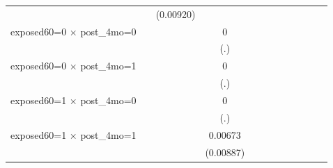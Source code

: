 \begin{table}[htbp]
\begin{tabular}{l*{11}{c}}
                    &                     &   (0.00920)         &                     &                     &                     &                     &                     &                     &                     &                     &                     \\
\addlinespace
exposed60=0 $\times$ post\_4mo=0&                     &                     &           0         &                     &                     &                     &                     &                     &                     &                     &                     \\
                    &                     &                     &         (.)         &                     &                     &                     &                     &                     &                     &                     &                     \\
\addlinespace
exposed60=0 $\times$ post\_4mo=1&                     &                     &           0         &                     &                     &                     &                     &                     &                     &                     &                     \\
                    &                     &                     &         (.)         &                     &                     &                     &                     &                     &                     &                     &                     \\
\addlinespace
exposed60=1 $\times$ post\_4mo=0&                     &                     &           0         &                     &                     &                     &                     &                     &                     &                     &                     \\
                    &                     &                     &         (.)         &                     &                     &                     &                     &                     &                     &                     &                     \\
\addlinespace
exposed60=1 $\times$ post\_4mo=1&                     &                     &     0.00673         &                     &                     &                     &                     &                     &                     &                     &                     \\
                    &                     &                     &   (0.00887)         &                     &                     &                     &                     &                     &                     &                     &                     \\

\end{tabular}
\end{table}
